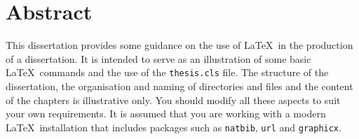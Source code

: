 \chapter{Abstract}

This dissertation provides some guidance on the use of \LaTeX\ in the
production of a dissertation. It is intended to serve as an
illustration of some basic \LaTeX\ commands and the use of the
\texttt{thesis.cls} file.  The structure of the dissertation, the
organisation and naming of directories and files and the content of
the chapters is illustrative only.  You should modify all these
aspects to suit your own requirements. It is assumed that you are
working with a modern \LaTeX\ installation that includes packages such
as \texttt{natbib}, \texttt{url} and \texttt{graphicx}.




